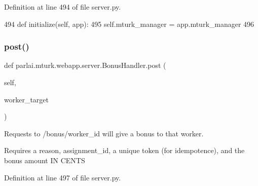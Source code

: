 Definition at line 494 of file server.\+py.


\begin{DoxyCode}
494     \textcolor{keyword}{def }initialize(self, app):
495         self.mturk\_manager = app.mturk\_manager
496 
\end{DoxyCode}
\mbox{\label{classparlai_1_1mturk_1_1webapp_1_1server_1_1BonusHandler_acdeaf6529109287285903ed8babe864c}} 
\subsubsection{\texorpdfstring{post()}{post()}}
{\footnotesize\ttfamily def parlai.\+mturk.\+webapp.\+server.\+Bonus\+Handler.\+post (\begin{DoxyParamCaption}\item[{}]{self,  }\item[{}]{worker\+\_\+target }\end{DoxyParamCaption})}

\begin{DoxyVerb}Requests to /bonus/{worker_id} will give a bonus to that worker.

Requires a reason, assignment_id, a unique token (for idempotence), and the
bonus amount IN CENTS
\end{DoxyVerb}
 

Definition at line 497 of file server.\+py.


